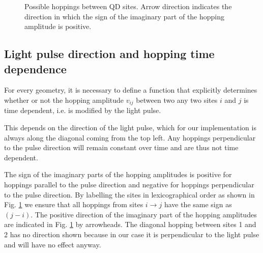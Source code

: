 \begin{figure}[!hbt]
\begin{minipage}[b]{.48\textwidth}
    \caption{Possible hoppings between QD sites. Arrow direction indicates the direction in which the sign of the imaginary part of the hopping amplitude is positive.}
    \label{fig:qd_hoppings}
    \end{minipage}
\end{figure}

 \subsection{Light pulse direction and hopping time dependence}
For every geometry, it is necessary to define a function that explicitly determines whether or not the hopping amplitude $v_{ij}$ between two any two sites $i$ and $j$ is time dependent, i.e. is modified by the light pulse.
\medskip

This depends on the direction of the light pulse, which for our implementation is always along the diagonal coming from the top left. Any hoppings perpendicular to the pulse direction will remain constant over time and are thus not time dependent.
\medskip

The sign of the imaginary parts of the hopping amplitudes is positive for hoppings parallel to the pulse direction and negative for hoppings perpendicular to the pulse direction. By labelling the sites in lexicographical order as shown in Fig. \ref{fig:qd_hoppings} we ensure that all hoppings from sites $i\to j$ have the same sign as $(j-i)$. The positive direction of the imaginary part of the hopping amplitudes are indicated in Fig. \ref{fig:qd_hoppings} by arrowheads. The diagonal hopping between sites 1 and 2 has no direction shown because in our case it is perpendicular to the light pulse and will have no effect anyway.

